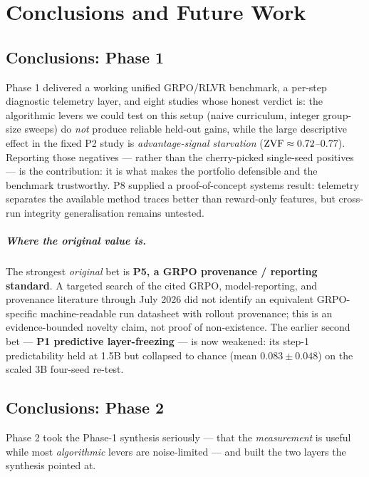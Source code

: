 \chapter{Conclusions and Future Work}
\label{ch:conclusion}

\section{Conclusions: Phase 1}

Phase 1 delivered a working unified GRPO/RLVR benchmark, a per-step diagnostic
telemetry layer, and eight studies whose honest verdict is: the algorithmic levers
we could test on this setup (naive curriculum, integer group-size sweeps) do
\emph{not} produce reliable held-out gains, while the large descriptive effect in
the fixed P2 study is \emph{advantage-signal starvation} ($\mathrm{ZVF} \approx
0.72$--$0.77$). Reporting those negatives --- rather than the cherry-picked
single-seed positives --- is the contribution: it is what makes the portfolio
defensible and the benchmark trustworthy. P8 supplied a proof-of-concept systems
result: telemetry separates the available method traces better than reward-only
features, but cross-run integrity generalisation remains untested.

\paragraph{Where the original value is.} The strongest \emph{original} bet is
\textbf{P5, a GRPO provenance / reporting standard}. A targeted search of the
cited GRPO, model-reporting, and provenance literature through July 2026 did not
identify an equivalent GRPO-specific machine-readable run datasheet with rollout
provenance; this is an evidence-bounded novelty claim, not proof of
non-existence. The earlier second bet --- \textbf{P1 predictive layer-freezing}
--- is now weakened: its step-1 predictability held at 1.5B but collapsed to
chance (mean $0.083\pm0.048$) on the scaled 3B four-seed re-test.

\section{Conclusions: Phase 2}

Phase 2 took the Phase-1 synthesis seriously --- that the \emph{measurement} is
useful while most \emph{algorithmic} levers are noise-limited --- and built the
two layers the synthesis pointed at.

